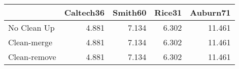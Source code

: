 \begin{tabular}{lrrrr}
\toprule
{} & Caltech36 & Smith60 & Rice31 & Auburn71 \\
\midrule
No Clean Up  &     4.881 &   7.134 &  6.302 &   11.461 \\
Clean-merge  &     4.881 &   7.134 &  6.302 &   11.461 \\
Clean-remove &     4.881 &   7.134 &  6.302 &   11.461 \\
\bottomrule
\end{tabular}

